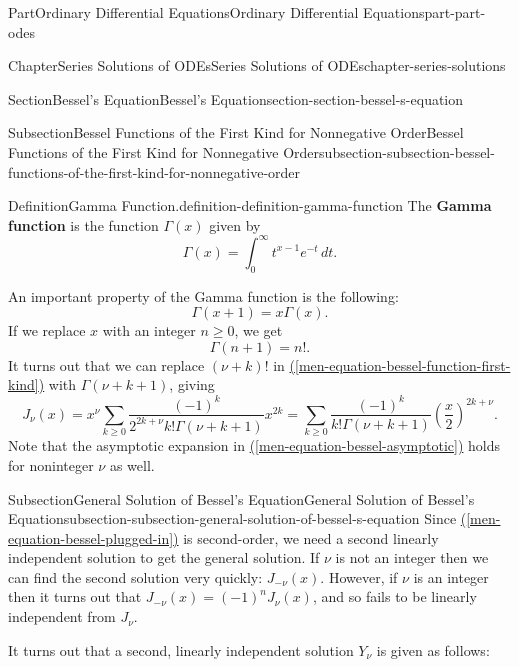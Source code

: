 \documentclass[twoside,10pt,]{book}
\newcommand{\xreffont}{\relax}
\newcommand{\terminology}[1]{\textbf{#1}}
\numberwithin{equation}{part}
\begin{document}
\begin{partptx}{Part}{Ordinary Differential Equations}{}{Ordinary Differential Equations}{}{}{part-part-odes}
\begin{chapterptx}{Chapter}{Series Solutions of ODEs}{}{Series Solutions of ODEs}{}{}{chapter-series-solutions}
\begin{sectionptx}{Section}{Bessel's Equation}{}{Bessel's Equation}{}{}{section-section-bessel-s-equation}
\begin{subsectionptx}{Subsection}{Bessel Functions of the First Kind for Nonnegative Order}{}{Bessel Functions of the First Kind for Nonnegative Order}{}{}{subsection-subsection-bessel-functions-of-the-first-kind-for-nonnegative-order}
\begin{definition}{Definition}{Gamma Function.}{definition-definition-gamma-function}%
%
The \terminology{Gamma function} is the function \(\Gamma(x)\) given by%
\begin{equation*}
\Gamma(x) = \int_{0}^{\infty}t^{x-1}e^{-t}\,dt\text{.}
\end{equation*}
%
\end{definition}
An important property of the Gamma function is the following:%
\begin{equation*}
\Gamma(x + 1) = x\Gamma(x)\text{.}
\end{equation*}
If we replace \(x\) with an integer \(n\geq0\), we get%
\begin{equation*}
\Gamma(n + 1) = n!\text{.}
\end{equation*}
It turns out that we can replace \((\nu + k)!\) in \hyperref[men-equation-bessel-function-first-kind]{({\xreffont\ref{men-equation-bessel-function-first-kind}})} with \(\Gamma(\nu + k + 1)\), giving%
\begin{equation}
J_{\nu}(x) = x^{\nu}\sum_{k\geq0}\frac{(-1)^{k}}{2^{2k + \nu}k!\Gamma(\nu + k + 1)}x^{2k} = \sum_{k\geq0} \frac{(-1)^{k}}{k!\Gamma(\nu + k + 1)}\left(\frac{x}{2}\right)^{2k + \nu}\text{.}\label{men-equation-bessel-first-kind-nonnegative-order}
\end{equation}
Note that the asymptotic expansion in \hyperref[men-equation-bessel-asymptotic]{({\xreffont\ref{men-equation-bessel-asymptotic}})} holds for noninteger \(\nu\) as well.%
\end{subsectionptx}
%
%
\typeout{************************************************}
\typeout{************************************************}
%
\begin{subsectionptx}{Subsection}{General Solution of Bessel's Equation}{}{General Solution of Bessel's Equation}{}{}{subsection-subsection-general-solution-of-bessel-s-equation}
Since \hyperref[men-equation-bessel-plugged-in]{({\xreffont\ref{men-equation-bessel-plugged-in}})} is second-order, we need a second linearly independent solution to get the general solution. If \(\nu\) is not an integer then we can find the second solution very quickly: \(J_{-\nu}(x)\). However, if \(\nu\) is an integer then it turns out that \(J_{-\nu}(x) = (-1)^{n}J_{\nu}(x)\), and so fails to be linearly independent from \(J_{\nu}\).%
\par
It turns out that a second, linearly independent solution \(Y_{\nu}\) is given as follows:%

\end{subsectionptx}
\end{sectionptx}
\end{chapterptx}
\end{partptx}
\end{document}
